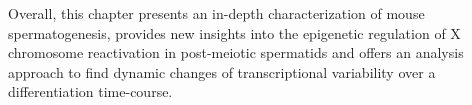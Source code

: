 Overall, this chapter presents an in-depth characterization of mouse spermatogenesis, provides new insights into the epigenetic regulation of X chromosome reactivation in post-meiotic spermatids and offers an analysis approach to find dynamic changes of transcriptional variability over a differentiation time-course.
